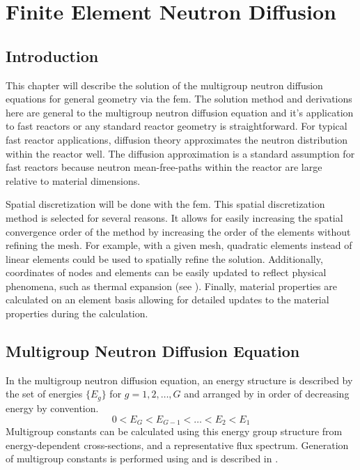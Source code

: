 \chapter{Finite Element Neutron Diffusion}
\label{ch:neutronDiffusion}

\section{Introduction}
  This chapter will describe the solution of the multigroup neutron diffusion 
  equations for general geometry via the \gls{fem}. The solution method and 
  derivations here are general to the multigroup neutron diffusion equation and 
  it's application to fast reactors or any standard reactor geometry is 
  straightforward. For typical fast reactor applications, diffusion theory 
  approximates the neutron distribution within the reactor well. The diffusion 
  approximation is a standard assumption for fast reactors because neutron 
  mean-free-paths within the reactor are large relative to material dimensions.

  Spatial discretization will be done with the \gls{fem}. This spatial 
  discretization method is selected for several reasons. It allows for easily 
  increasing the spatial convergence order of the method by increasing the order
  of the elements without refining the mesh. For example, with a given mesh, 
  quadratic elements instead of linear elements could be used to spatially 
  refine the solution. Additionally, coordinates of nodes and elements can be 
  easily updated to reflect physical phenomena, such as thermal expansion (see 
  ).  Finally, material properties are calculated on 
  an element basis allowing for detailed updates to the material properties 
  during the calculation.

\section{Multigroup Neutron Diffusion Equation}
  In the multigroup neutron diffusion equation, an energy structure is 
  described by the set of energies $\{E_g\}$ for $g = 1,2,\ldots,G$ and arranged 
  by in order of decreasing energy by convention.
  \begin{equation}
    0 < E_G < E_{G-1} < \ldots < E_2 < E_1
  \end{equation}
  Multigroup constants can be calculated using this energy group 
  structure from energy-dependent cross-sections, and a representative flux 
  spectrum. Generation of multigroup constants is performed using \mcc and is 
  described in .

